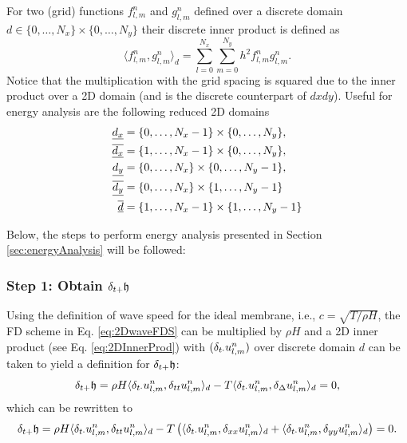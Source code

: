For two (grid) functions $f_{l,m}^n$ and $g_{l,m}^n$ defined over a discrete domain $d\in \{0, \hdots, N_x\} \times \{0, \hdots, N_y\}$ their discrete inner product is defined as
\begin{equation}\label{eq:2DInnerProd}
    \langle f^n_{l, m}, g^n_{l, m} \rangle_d = \sum_{l = 0}^{N_x}\sum_{m = 0}^{N_y} h^2 f_{l,m}^n g_{l,m}^n.
\end{equation}
Notice that the multiplication with the grid spacing is squared due to the inner product over a 2D domain (and is the discrete counterpart of $dxdy$). Useful for energy analysis are the following reduced 2D domains 
\begin{subequations}\label{eq:reduced2Ddoms}
    \begin{align}
        \underline{d_x} &= \{0, \hdots, N_x-1\} \times \{0, \hdots, N_y\}, \\
        \underline{\overline{d_x}} &= \{1, \hdots, N_x-1\} \times \{0, \hdots, N_y\},\\
        \underline{d_y} &= \{0, \hdots, N_x\} \times \{0, \hdots, N_y-1\},\\
        \underline{\overline{d_y}} &= \{0, \hdots, N_x\} \times \{1, \hdots, N_y-1\}\\
        \underline{\overline{d}} &= \{1, \hdots, N_x-1\} \times \{1, \hdots, N_y-1\}
    \end{align}  
\end{subequations}



Below, the steps to perform energy analysis presented in Section \ref{sec:energyAnalysis} will be followed:
\subsubsection{Step 1: Obtain $\delta_{t+} \mathfrak{h}$}
Using the definition of wave speed for the ideal membrane, i.e., $c = \sqrt{T/ \rho H}$, the FD scheme in Eq. \eqref{eq:2DwaveFDS} can be multiplied by $\rho H$ and a 2D inner product (see Eq. \eqref{eq:2DInnerProd}) with $(\delta_{t\cdot} u_{l,m}^n)$ over discrete domain $d$ can be taken to yield a definition for $\delta_{t+} \mathfrak{h}$:
\begin{equation*}
    \delta_{t+} \mathfrak{h} = \rho H\langle \delta_{t\cdot} u_{l,m}^n , \delta_{tt} u_{l,m}^n\rangle_d - T \langle \delta_{t\cdot}u_{l,m}^n, \delta_{\Delta} u_{l,m}^n\rangle_d = 0,
\end{equation*}
which can be rewritten to
\begin{equation*}
    \delta_{t+} \mathfrak{h}= \rho H\langle \delta_{t\cdot} u_{l,m}^n , \delta_{tt} u_{l,m}^n\rangle_d - T \left(\langle \delta_{t\cdot}u_{l,m}^n, \delta_{xx} u_{l,m}^n\rangle_d + \langle \delta_{t\cdot}u_{l,m}^n, \delta_{yy} u_{l,m}^n\rangle_d \right) = 0.
\end{equation*}

